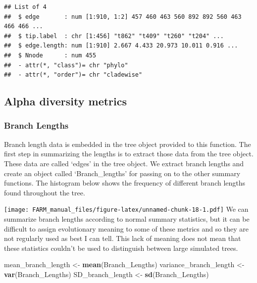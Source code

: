\documentclass[]{book}
\newenvironment{Shaded}{\begin{snugshade}}{\end{snugshade}}
\newcommand{\KeywordTok}[1]{\textcolor[rgb]{0.13,0.29,0.53}{\textbf{{#1}}}}
\newcommand{\StringTok}[1]{\textcolor[rgb]{0.31,0.60,0.02}{{#1}}}
\newcommand{\OperatorTok}[1]{\textcolor[rgb]{0.81,0.36,0.00}{\textbf{{#1}}}}
\newcommand{\NormalTok}[1]{{#1}}
\theoremstyle{definition}
\theoremstyle{definition}
\theoremstyle{remark}
\begin{document}
\begin{verbatim}
## List of 4
##  $ edge       : num [1:910, 1:2] 457 460 463 560 892 892 560 463 466 466 ...
##  $ tip.label  : chr [1:456] "t862" "t409" "t260" "t204" ...
##  $ edge.length: num [1:910] 2.667 4.433 20.973 10.011 0.916 ...
##  $ Nnode      : num 455
##  - attr(*, "class")= chr "phylo"
##  - attr(*, "order")= chr "cladewise"
\end{verbatim}

\hypertarget{alpha-diversity-metrics}{\subsection{Alpha diversity
metrics}\label{alpha-diversity-metrics}}

\hypertarget{branch-lengths}{\subsubsection{Branch
Lengths}\label{branch-lengths}}

Branch length data is embedded in the tree object provided to this
function. The first step in summarizing the lengths is to extract those
data from the tree object. These data are called `edges' in the tree
object. We extract branch lengths and create an object called
`Branch\_lengths' for passing on to the other summary functions. The
histogram below shows the frequency of different branch lengths found
throughout the tree.

\begin{Shaded}
\end{Shaded}

\texttt{[image: FARM\_manual\_files/figure-latex/unnamed-chunk-18-1.pdf]}
We can summarize branch lengths according to normal summary statistics,
but it can be difficult to assign evolutionary meaning to some of these
metrics and so they are not regularly used as best I can tell. This lack
of meaning does not mean that these statistics couldn't be used to
distinguish between large simulated trees.

\begin{Shaded}
\begin{Highlighting}[]
\NormalTok{mean_branch_length <-}\StringTok{ }\KeywordTok{mean}\NormalTok{(Branch_Lengths)}
\NormalTok{variance_branch_length <-}\StringTok{ }\KeywordTok{var}\NormalTok{(Branch_Lengths)}
\NormalTok{SD_branch_length <-}\StringTok{ }\KeywordTok{sd}\NormalTok{(Branch_Lengths)}
\end{Highlighting}
\end{Shaded}
\end{document}
